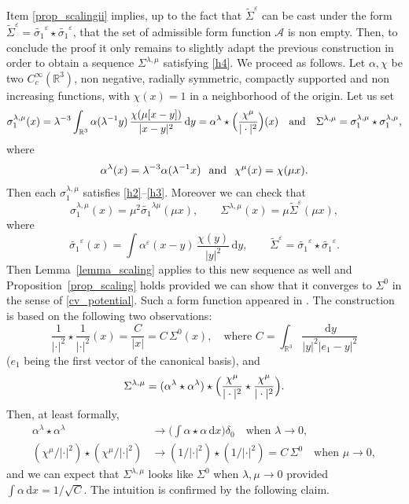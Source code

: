 \documentclass[10pt]{amsart}
\let\epsilon\varepsilon
\theoremstyle{definition}
\newcommand{\R}{\mathbb{R}}
\let\ds\displaystyle
\newcommand{\ud}{\, {\mathrm{d}}}
\begin{document}
Item \eqref{prop_scalingii} implies, up to the fact that $\widetilde{\Sigma}^{\epsilon}$ can be cast under the form $\widetilde{\Sigma}^{\epsilon}=\widetilde{\sigma_{1}}^{\epsilon}\star\widetilde{\sigma_{1}}^{\epsilon}$, that the set of admissible form function $\mathscr{A}$ is non empty. Then, to conclude the proof it only remains to slightly adapt the previous construction in order to obtain a sequence $\Sigma^{\lambda,\mu}$ satisfying \eqref{h4}.
We proceed as follows.
Let $\alpha, \chi$ be two $C^\infty_c(\mathbb R^3)$, non negative, radially symmetric, compactly supported and non increasing functions, with $\chi(x)=1$ in a neighborhood of the origin.
Let us set
\[
\sigma_{1}^{\lambda,\mu}(x)=\lambda^{-3}\int_{\R^{3}}\alpha(\lambda^{-1}y)\,\frac{\chi(\mu[x-y])}{|x-y|^{2}}\ud y=\alpha^{\lambda}\star\Bigl(\frac{\chi^{\mu}}{|\cdot|^{2}}\Bigr)(x)
\quad\text{and}\quad
\Sigma^{\lambda,\mu}=\sigma_{1}^{\lambda,\mu}\star\sigma_{1}^{\lambda,\mu},
\]
where
\[
\alpha^{\lambda}(x)=\lambda^{-3}\alpha(\lambda^{-1}x) \hspace{0.25cm}\text{and}\hspace{0.25cm} \chi^{\mu}(x)=\chi(\mu x).
\]
Then each $\sigma_{1}^{\lambda,\mu}$ satisfies \eqref{h2}--\eqref{h3}. Moreover we can check that
\[
\sigma_{1}^{\lambda,\mu}(x)=\mu^{2}\widetilde{\sigma_{1}}^{\lambda\mu}(\mu x),\qquad
\Sigma^{\lambda,\mu}(x)=\mu\widetilde{\Sigma}^{\epsilon}(\mu x),
\]
where
\[
\widetilde{\sigma_{1}}^{\epsilon}(x)=\ds\int \alpha^{\epsilon}(x-y)\,\frac{\chi (y)}{| y |^{2}}\ud y,
\qquad
\widetilde{\Sigma}^{\epsilon}=\widetilde{\sigma_{1}}^{\epsilon}\star\widetilde{\sigma_{1}}^{\epsilon}.
\]
Then Lemma~\ref{lemma_scaling} applies to this new sequence as well and Proposition~\ref{prop_scaling} holds
provided we can show that it
converges to $\Sigma^{0}$ in the sense of \eqref{cv_potential}.
Such a form function appeared in \cite{dBGV}. The construction is based on the following two observations:
\[
\frac{1}{|\cdot|^{2}}\star\frac{1}{|\cdot|^{2}}(x)=\frac{C}{|x|}=C\,\Sigma^{0}(x),\quad\text{where } C=\int_{\R^{3}}\frac{\ud y}{|y|^2|e_1-y|^2}
\]
($e_1$ being the first vector of the canonical basis),
and
\[
\Sigma^{\lambda,\mu}=(\alpha^{\lambda}\star\alpha^{\lambda})\star\Bigl(\frac{\chi^{\mu}}{|\cdot|^{2}}\star\frac{\chi^{\mu}}{|\cdot|^{2}}\Bigr).
\]
Then, at least formally,
\begin{align*}
\alpha^{\lambda}\star\alpha^{\lambda}&\to\biggl(\int\alpha\star\alpha\ud x\biggr)\delta_{0}\quad\text{when }\lambda\to 0,\\
(\chi^{\mu}/|\cdot|^{2})\star(\chi^{\mu}/|\cdot|^{2})&\to(1/|\cdot|^{2})\star(1/|\cdot|^{2})=C\,\Sigma^{0}\quad\text{when }\mu\to 0,
\end{align*}
and we can expect that $\Sigma^{\lambda,\mu}$ looks like
$\Sigma^{0}$ when $\lambda,\mu\to 0$ provided $\int\alpha\ud x=1/\sqrt{C}$.
The intuition is confirmed by the following claim.
\end{document}
